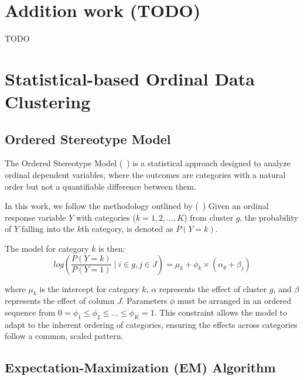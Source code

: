 \documentclass{article}
\begin{document}
\section{Addition work (TODO)}

TODO

\section{Statistical-based Ordinal Data Clustering}

\subsection{Ordered Stereotype Model}

The Ordered Stereotype Model  (~\cite{anderson1984regression}) is a statistical approach designed to analyze ordinal dependent variables, where the outcomes are categories with a natural order but not a quantifiable difference between them.

In this work, we follow the methodology outlined by (~\cite{fernandez2016mixture})
Given an ordinal response variable $Y$ with categories ($k=1, 2, \ldots, K$) from cluster $g$, the probability of $Y$ falling into the $k$th category, is denoted as $P(Y = k)$.


The model for category $k$ is then:
\begin{equation}
log\left(\frac{P(Y = k)}{P(Y = 1)} \mid i \in g, j \in J\right) = \mu_k + \phi_k \times \left(\alpha_g + \beta_j\right) 
\end{equation}

where $\mu_k$ is the intercept for category $k$, 
 $\alpha$ represents the effect of cluster $g$,
and $\beta$ represents the effect of column $J$.
Parameters $\phi$ must be arranged in an ordered sequence from 
$0 = \phi_1 \leq \phi_2 \leq \ldots \leq \phi_K = 1.$ 
This constraint allows the model to adapt to the inherent ordering of categories, ensuring the effects across categories follow a common, scaled pattern.


  


\subsection{Expectation-Maximization (EM) Algorithm}

\end{document}
